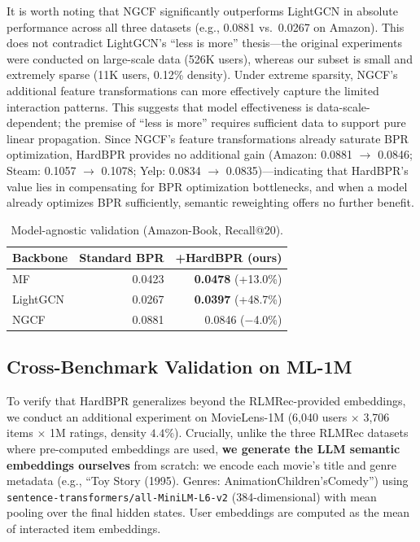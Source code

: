 \documentclass[11pt,a4paper]{article}
\begin{document}
It is worth noting that NGCF significantly outperforms LightGCN in absolute performance across all three datasets (e.g., 0.0881 vs.\ 0.0267 on Amazon). This does not contradict LightGCN's ``less is more'' thesis---the original experiments were conducted on large-scale data (526K users), whereas our subset is small and extremely sparse (11K users, 0.12\% density). Under extreme sparsity, NGCF's additional feature transformations can more effectively capture the limited interaction patterns. This suggests that model effectiveness is data-scale-dependent; the premise of ``less is more'' requires sufficient data to support pure linear propagation. Since NGCF's feature transformations already saturate BPR optimization, HardBPR provides no additional gain (Amazon: 0.0881 $\to$ 0.0846; Steam: 0.1057 $\to$ 0.1078; Yelp: 0.0834 $\to$ 0.0835)---indicating that HardBPR's value lies in compensating for BPR optimization bottlenecks, and when a model already optimizes BPR sufficiently, semantic reweighting offers no further benefit.

\begin{table}[ht]
    \centering
    \caption{Model-agnostic validation (Amazon-Book, Recall@20).}
    \label{tab:mf}
    \begin{tabular}{lrr}
        \toprule
        Backbone & Standard BPR & +HardBPR (ours) \\
        \midrule
        MF & 0.0423 & \textbf{0.0478} (+13.0\%) \\
        LightGCN & 0.0267 & \textbf{0.0397} (+48.7\%) \\
        NGCF & 0.0881 & 0.0846 ($-$4.0\%) \\
        \bottomrule
    \end{tabular}
\end{table}

\subsection{Cross-Benchmark Validation on ML-1M}

To verify that HardBPR generalizes beyond the RLMRec-provided embeddings, we conduct an additional experiment on MovieLens-1M (6,040 users $\times$ 3,706 items $\times$ 1M ratings, density $4.4\%$). Crucially, unlike the three RLMRec datasets where pre-computed embeddings are used, \textbf{we generate the LLM semantic embeddings ourselves} from scratch: we encode each movie's title and genre metadata (e.g., ``Toy Story (1995). Genres: Animation{\textbar}Children's{\textbar}Comedy'') using \texttt{sentence-transformers/all-MiniLM-L6-v2} (384-dimensional) with mean pooling over the final hidden states. User embeddings are computed as the mean of interacted item embeddings.
\end{document}
